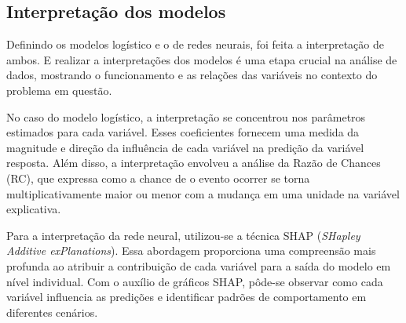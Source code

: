 \subsection{Interpretação dos modelos}


Definindo os modelos logístico e o de redes neurais, foi feita a interpretação de ambos.
E realizar a interpretações dos modelos é uma etapa crucial na análise de dados, mostrando
 o funcionamento e as relações das variáveis no contexto do problema em questão. 

No caso do modelo logístico, a interpretação se concentrou nos parâmetros estimados para cada variável. 
Esses coeficientes fornecem uma medida da magnitude e direção da influência de cada variável na predição da
 variável resposta. Além disso, a interpretação envolveu a análise da Razão de Chances (RC), que expressa 
 como a chance de o evento ocorrer se torna multiplicativamente maior ou menor com a mudança em uma unidade 
 na variável explicativa.

Para a interpretação da rede neural, utilizou-se a técnica SHAP (\textit{SHapley Additive exPlanations}). 
Essa abordagem proporciona uma compreensão mais profunda ao atribuir a contribuição de cada variável para a saída do 
modelo em nível individual. Com o auxílio de gráficos SHAP, pôde-se observar como cada variável influencia as predições 
e identificar padrões de comportamento em diferentes cenários.


